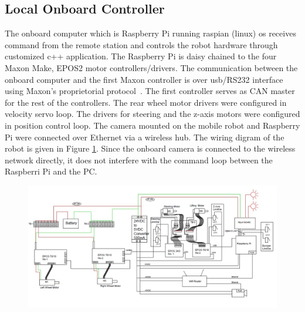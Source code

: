 \subsection{Local Onboard Controller}
The  onboard computer which is Raspberry Pi running raspian (linux) os receives  command from the remote station and controls the robot hardware through customized c++ application.
The Raspberry Pi  is daisy chained to the four Maxon Make, EPOS2 motor controllers/drivers. The communication between the onboard computer and the first Maxon controller is over usb/RS232 interface using Maxon's proprietorial protocol~\cite{maxonrs232}. The first controller serves as CAN master for the rest of the controllers. The rear wheel motor drivers were configured in velocity servo loop. The drivers for steering and the z-axis motors were configured in position control loop.  The camera mounted on the mobile robot  and Raspberry Pi  were connected over Ethernet via a wireless hub. The wiring digram of the robot is given in Figure \ref {fig:wiring}. Since the onboard camera is connected to the wireless network directly, it does not interfere with the command loop between the Raspberri Pi and the PC. 
\begin{figure}
	\includegraphics[width=\linewidth,keepaspectratio]{Chapter5/fig/RobotSideWiring}
	\label{fig:wiring} 
\end{figure} 

